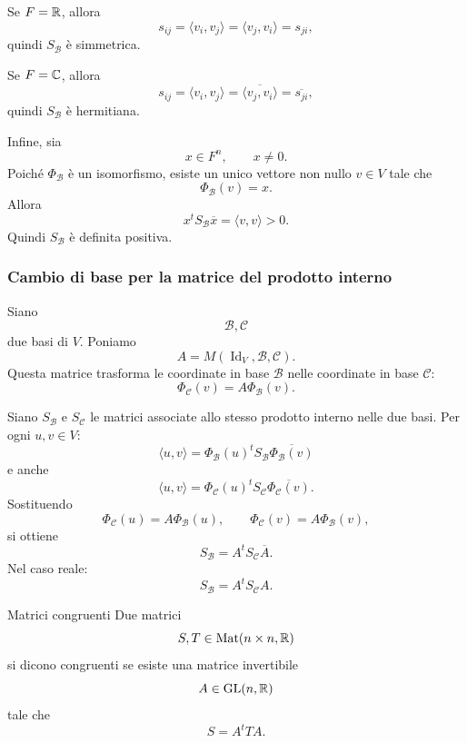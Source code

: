 \documentclass[a4paper]{article}
\begin{document}
\begin{snippetproof}{}
    Se \(F=\mathbb{R}\), allora
    \[
        s_{ij}=\langle v_i,v_j\rangle=\langle v_j,v_i\rangle=s_{ji},
    \]
    quindi \(S_{\mathcal{B}}\) è simmetrica.

    Se \(F=\mathbb{C}\), allora
    \[
        s_{ij}
        =
        \langle v_i,v_j\rangle
        =
        \overline{\langle v_j,v_i\rangle}
        =
        \overline{s_{ji}},
    \]
    quindi \(S_{\mathcal{B}}\) è hermitiana.

    Infine, sia
    \[
        x\in F^n,
        \qquad
        x\neq 0.
    \]
    Poiché \(\Phi_{\mathcal{B}}\) è un isomorfismo, esiste un unico vettore non nullo \(v\in V\) tale che
    \[
        \Phi_{\mathcal{B}}(v)=x.
    \]
    Allora
    \[
        x^tS_{\mathcal{B}}\overline{x}
        =
        \langle v,v\rangle
        >
        0.
    \]
    Quindi \(S_{\mathcal{B}}\) è definita positiva.
\end{snippetproof}

\subsubsection{Cambio di base per la matrice del prodotto interno}

Siano
\[
    \mathcal{B},\mathcal{C}
\]
due basi di \(V\). Poniamo
\[
    A=M(\operatorname{Id}_V,\mathcal{B},\mathcal{C}).
\]
Questa matrice trasforma le coordinate in base \(\mathcal{B}\) nelle coordinate in base \(\mathcal{C}\):
\[
    \Phi_{\mathcal{C}}(v)=A\Phi_{\mathcal{B}}(v).
\]

Siano \(S_{\mathcal{B}}\) e \(S_{\mathcal{C}}\) le matrici associate allo stesso prodotto interno nelle due basi. Per ogni \(u,v\in V\):
\[
    \langle u,v\rangle
    =
    \Phi_{\mathcal{B}}(u)^t
    S_{\mathcal{B}}
    \overline{\Phi_{\mathcal{B}}(v)}
\]
e anche
\[
    \langle u,v\rangle
    =
    \Phi_{\mathcal{C}}(u)^t
    S_{\mathcal{C}}
    \overline{\Phi_{\mathcal{C}}(v)}.
\]
Sostituendo
\[
    \Phi_{\mathcal{C}}(u)=A\Phi_{\mathcal{B}}(u),
    \qquad
    \Phi_{\mathcal{C}}(v)=A\Phi_{\mathcal{B}}(v),
\]
si ottiene
\[
    S_{\mathcal{B}}
    =
    A^tS_{\mathcal{C}}\overline{A}.
\]
Nel caso reale:
\[
    S_{\mathcal{B}}
    =
    A^tS_{\mathcal{C}}A.
\]

\begin{snippetdefinition}{Matrici congruenti}
    Due matrici
    \[
        S,T\in\operatorname{Mat}(n\times n,\mathbb{R})
    \]
    si dicono congruenti se esiste una matrice invertibile
    \[
        A\in\operatorname{GL}(n,\mathbb{R})
    \]
    tale che
    \[
        S=A^tTA.
    \]
\end{snippetdefinition}
\end{document}
